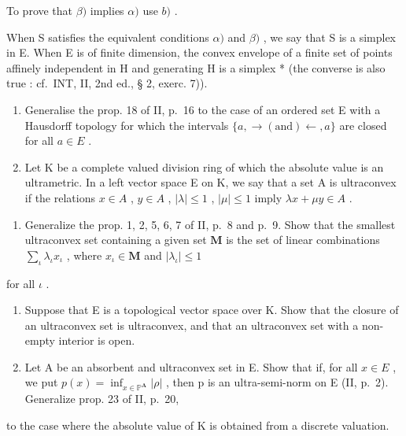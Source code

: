 To prove that \(\beta)\) implies \(\alpha)\) use \(b)\) .

When S satisfies the equivalent conditions \(\alpha)\) and \(\beta)\) , we say that S is a simplex in E. When E is of finite dimension, the convex envelope of a finite set of points affinely independent in H and generating H is a simplex * (the converse is also true : cf.~INT, II, 2nd ed., § 2, exerc. 7)).

\begin{enumerate}
\def\labelenumi{\arabic{enumi})}
\setcounter{enumi}{41}
\item
  Generalise the prop. 18 of II, p.~16 to the case of an ordered set E with a Hausdorff topology for which the intervals \(\{a, \to (\text{and}) \gets, a\}\) are closed for all \(a \in E\) .
\item
  Let K be a complete valued division ring of which the absolute value is an ultrametric. In a left vector space E on K, we say that a set A is ultraconvex if the relations \(x \in A\) , \(y \in A\) , \(|\lambda| \leqslant 1\) , \(|\mu| \leqslant 1\) imply \(\lambda x + \mu y \in A\) .
\end{enumerate}

\begin{enumerate}
\def\labelenumi{\alph{enumi})}
\tightlist
\item
  Generalize the prop. 1, 2, 5, 6, 7 of II, p.~8 and p.~9. Show that the smallest ultraconvex set containing a given set \(\mathbf{M}\) is the set of linear combinations \(\sum_{\iota} \lambda_{\iota} x_{\iota}\) , where \(x_{\iota} \in \mathbf{M}\) and \(|\lambda_{\iota}| \leqslant 1\)
\end{enumerate}

for all \(\iota\) .

\begin{enumerate}
\def\labelenumi{\alph{enumi})}
\setcounter{enumi}{1}
\item
  Suppose that E is a topological vector space over K. Show that the closure of an ultraconvex set is ultraconvex, and that an ultraconvex set with a non-empty interior is open.
\item
  Let A be an absorbent and ultraconvex set in E. Show that if, for all \(x \in E\) , we put \(p(x) = \inf_{x \in \mathbb{P}^{\mathbf{A}}} |\rho|\) , then p is an ultra-semi-norm on E (II, p.~2). Generalize prop. 23 of II, p.~20,
\end{enumerate}

to the case where the absolute value of K is obtained from a discrete valuation.

